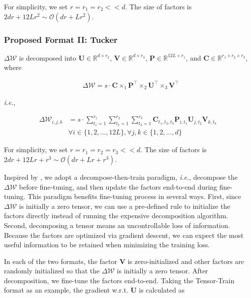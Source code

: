 For simplicity, we set $r=r_1=r_2<<d$. The size of factors is $2dr+12Lr^2\sim\mathcal{O}(dr+Lr^2)$. 
\subsubsection{Proposed Format II: Tucker}
$\Delta\boldsymbol{\mathcal{W}}$ is decomposed into $\boldsymbol{U} \in \mathbb{R}^{d\times r_2}$, $\boldsymbol{V} \in \mathbb{R}^{d\times r_3}$, $\boldsymbol{P} \in \mathbb{R}^{12L\times r_1}$, and $\boldsymbol{C} \in \mathbb{R}^{r_1 \times r_2\times r_3}$, where

\begin{equation}
\begin{aligned}
    &\Delta\boldsymbol{\mathcal{W}}=s\cdot\boldsymbol{C}\times_1\boldsymbol{P}^\intercal\times_2\boldsymbol{U}^\intercal\times_3\boldsymbol{V}^\intercal
\end{aligned}    
\end{equation}

\emph{i.e.},

\begin{equation}
\begin{aligned}
    \Delta\boldsymbol{\mathcal{W}}_{i,j,k}&=s\cdot\sum_{t_1=1}^{r_1}\sum_{t_2=1}^{r_2}\sum_{t_3=1}^{r_3}\boldsymbol{C}_{t_1,t_2,t_3}\boldsymbol{P}_{i,t_1}\boldsymbol{U}_{j,t_2}\boldsymbol{V}_{k,t_3}\\&\forall i\in\{1,2,...,12L\}, \forall j,k\in\{1,2,...,d\}
\end{aligned}    
\end{equation}

For simplicity, we set $r=r_1=r_2=r_3<<d$. The size of factors is $2dr+12Lr+r^3\sim\mathcal{O}(dr+Lr+r^3)$. 

Inspired by \citet{lora}, we adopt a decompose-then-train paradigm, \emph{i.e.}, decompose the $\Delta\boldsymbol{\mathcal{W}}$ before fine-tuning, and then update the factors end-to-end during fine-tuning. This paradigm benefits fine-tuning process in several ways. First, since $\Delta\boldsymbol{\mathcal{W}}$ is initially a zero tensor, we can use a pre-defined rule to initialize the factors directly instead of running the expensive decomposition algorithm. Second, decomposing a tensor means an uncontrollable loss of information. Because the factors are optimized via gradient descent, we can expect the most useful information to be retained when minimizing the training loss.

In each of the two formats, the factor $\boldsymbol{V}$ is zero-initialized and other factors are randomly initialized so that the $\Delta\boldsymbol{\mathcal{W}}$ is initially a zero tensor. After decomposition, we fine-tune the factors end-to-end. Taking the Tensor-Train format as an example, the gradient w.r.t. $\boldsymbol{U}$ is calculated as

